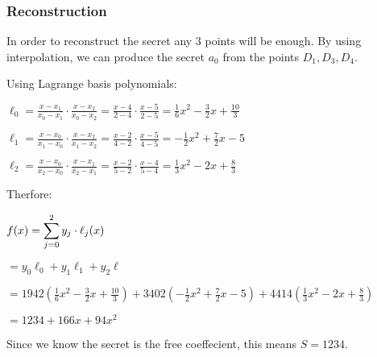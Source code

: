 \documentclass[fleqn,12pt,a4paper]{article}
\begin{document}
\newpage
\subsubsection{Reconstruction}

In order to reconstruct the secret any 3 points will be enough.
By using interpolation, we can produce the secret $\displaystyle{a_0}$ from the points 
$\displaystyle{D_1 , D_3 , D_4}$.

\vspace{5mm}
Using Lagrange basis polynomials:

\vspace{5mm}


$\displaystyle{\ell_0=\frac{x-x_1}{x_0-x_1}\cdot\frac{x-x_2}{x_0-x_2}=\frac{x-4}{2-4}\cdot\frac{x-5}{2-5}=\frac{1}{6}x^2-\frac{3}{2}x+\frac{10}{3}\,\!}$
\vspace{5mm}

$\displaystyle{\ell_1=\frac{x-x_0}{x_1-x_0}\cdot\frac{x-x_2}{x_1-x_2}=\frac{x-2}{4-2}\cdot\frac{x-5}{4-5}=-\frac{1}{2}x^2+\frac{7}{2}x-5\,\!}$
\vspace{5mm}


$\displaystyle{\ell_2=\frac{x-x_0}{x_2-x_0}\cdot\frac{x-x_1}{x_2-x_1}=\frac{x-2}{5-2}\cdot\frac{x-4}{5-4}=\frac{1}{3}x^2-2x+\frac{8}{3}\,\!}$
\vspace{6mm}


Therfore:
\vspace{3mm}


$\displaystyle{f(x)=\sum _{j=0}^{2}y_{j}\cdot \ell _{j}(x)\\[6pt]}$
\vspace{5mm}


\hspace{9mm}$\displaystyle{=y_{0}\ell _{0}+y_{1}\ell _{1}+y_{2}\ell}$
\vspace{5mm}


\hspace{9mm}$\displaystyle{=1942\left({\frac {1}{6}}x^{2}-{\frac {3}{2}}x+{\frac {10}{3}}\right)+3402\left(-{\frac {1}{2}}x^{2}+{\frac {7}{2}}x-5\right)+4414\left({\frac {1}{3}}x^{2}-2x+{\frac {8}{3}}\right)}$
\vspace{5mm}



\hspace{9mm}$\displaystyle{=1234+166x+94x^{2}}$
\vspace{5mm}


Since we know the secret is the free coeffecient, this means $\displaystyle{S = 1234}$.
\end{document}
